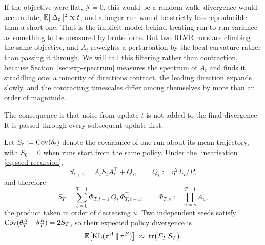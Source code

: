 If the objective were flat, $\mathcal{J} = 0$, this would be a random walk: divergence would
accumulate, $\mathbb{E}\|\Delta_t\|^2 \propto t$, and a longer run would be strictly less reproducible than
a short one. That is the implicit model behind treating run-to-run variance as something to be
measured by brute force. But two RLVR runs are climbing the same objective, and $A_t$ reweights a
perturbation by the local curvature rather than passing it through. We will call this filtering
rather than contraction, because Section~\ref{sec:exp-spectrum} measures the spectrum of $A_t$ and
finds it straddling one: a minority of directions contract, the leading direction expands slowly,
and the contracting timescales differ among themselves by more than an order of magnitude.

The consequence is that noise from update $t$ is not added to the final divergence. It is passed
through every subsequent update first.

\begin{theorem}
  \label{thm:propagation}
  Let $S_t := \operatorname{Cov}(\delta_t)$ denote the covariance of one run about its mean trajectory, with
  $S_0 = 0$ when runs start from the same policy. Under the linearisation \eqref{eq:seed-recursion},
  \begin{equation}
    \label{eq:lyapunov}
    S_{t+1} = A_t S_t A_t^{\!\top} + Q_t,
    \qquad Q_t := \eta^2 \Sigma_t / P,
  \end{equation}
  and therefore
  \begin{equation}
    \label{eq:unrolled}
    S_T = \sum_{t=0}^{T-1} \Phi_{T,t+1}\, Q_t\, \Phi_{T,t+1}^{\!\top},
    \qquad \Phi_{T,s} := \!\!\prod_{u=s}^{T-1}\!\! A_u ,
  \end{equation}
  the product taken in order of decreasing $u$.
  Two independent seeds satisfy $\operatorname{Cov}(\theta^A_T - \theta^B_T) = 2S_T$, so their expected policy
  divergence is
  \begin{equation}
    \label{eq:predicted-kl}
    \mathbb{E}\big[\mathrm{KL}(\pi^A \,\|\, \pi^B)\big] \;\approx\; \operatorname{tr}\!\big(F_T\, S_T\big).
  \end{equation}
\end{theorem}

